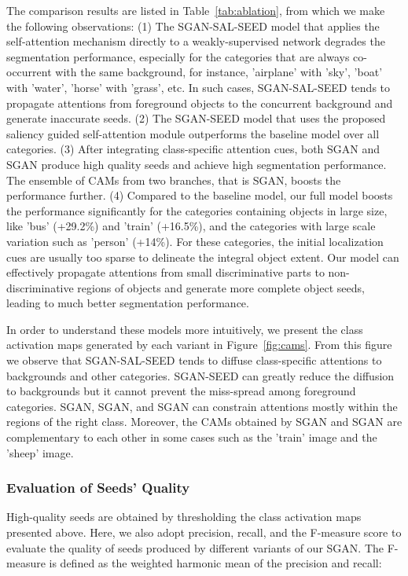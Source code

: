 \documentclass[journal]{IEEEtran}
\begin{document}
The comparison results are listed in Table~\ref{tab:ablation}, from which we make the following observations: 
(1) The SGAN-SAL-SEED model that applies the self-attention mechanism directly to a weakly-supervised network degrades the segmentation performance, especially for the categories that are always co-occurrent with the same background, for instance, 'airplane' with 'sky', 'boat' with 'water', 'horse' with 'grass', etc. In such cases, SGAN-SAL-SEED tends to propagate attentions from foreground objects to the concurrent background and generate inaccurate seeds. (2) The SGAN-SEED model that uses the proposed saliency guided self-attention module outperforms the baseline model over all categories. (3) After integrating class-specific attention cues, both SGAN and SGAN produce high quality seeds and achieve high segmentation performance. The ensemble of CAMs from two branches, that is SGAN, boosts the performance further. 
(4) Compared to the baseline model, our full model boosts the performance significantly for the categories containing objects in large size, like 'bus' (+29.2\%) and 'train' (+16.5\%), and the categories with large scale variation such as 'person' (+14\%). For these categories, the initial localization cues are usually too sparse to delineate the integral object extent. Our model can effectively propagate attentions from small discriminative parts to non-discriminative regions of objects and generate more complete object seeds, leading to much better segmentation performance. 

In order to understand these models more intuitively, we present the class activation maps generated by each variant in Figure~\ref{fig:cams}.  From this figure we observe that SGAN-SAL-SEED tends to diffuse class-specific attentions to backgrounds and other categories. SGAN-SEED can greatly reduce the diffusion to backgrounds but it cannot prevent the miss-spread among foreground categories. SGAN, SGAN, and SGAN can constrain attentions mostly within the regions of the right class. Moreover, the CAMs obtained by SGAN and SGAN are complementary to each other in some cases such as the 'train' image and the 'sheep' image.  



\subsubsection{Evaluation of Seeds' Quality}
High-quality seeds are obtained by thresholding the class activation maps presented above. Here, we also adopt precision, recall, and the F-measure score to evaluate the quality of seeds produced by different variants of our SGAN. The F-measure is defined as the weighted harmonic mean of the precision and recall:
\end{document}

